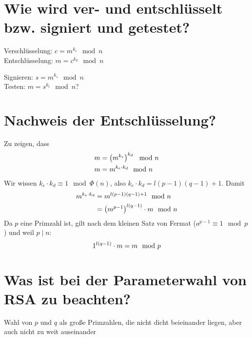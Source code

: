 \documentclass{article}
\begin{document}
	\section*{Wie wird ver- und entschlüsselt bzw. signiert und getestet?}
	Verschlüsselung: $c = m^{k_e} \mod n$ \\
	Entschlüsselung: $m = c^{k_d} \mod n$
	
	Signieren: $s = m^{k_s}\mod n$ \\
	Testen: $m = s^{k_t} \mod n$?
	
	\section*{Nachweis der Entschlüsselung?}
	Zu zeigen, dass
	\begin{align}
		m &= \left(m^{k_e}\right)^{k_d} \mod n \notag \\
		m &= m^{k_e\cdot k_d} \mod n \notag
	\end{align}
	Wir wissen $k_e\cdot k_d \equiv 1 \mod \Phi(n)$, also $k_e\cdot k_d = l(p-1)(q-1) + 1$. Damit
	\begin{align}
		m^{k_e\cdot k_d} &= m^{l(p-1)(q-1) + 1} \mod n \notag \\
		&= \left(m^{p-1}\right)^{l(q-1)} \cdot m \mod n \notag
	\end{align}
	Da $p$ eine Primzahl ist, gilt nach dem kleinen Satz von Fermat ($a^{p-1}\equiv 1 \mod p$) und weil $p\mid n$:
	\begin{align}
		1^{l(q-1)}\cdot m = m \mod p \notag
	\end{align}
	
	\section*{Was ist bei der Parameterwahl von RSA zu beachten?}
	Wahl von $p$ und $q$ als große Primzahlen, die nicht dicht beieinander liegen, aber auch nicht zu weit auseinander
	
\end{document}
